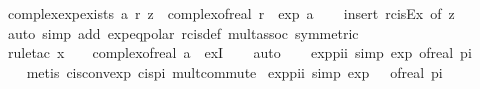 \begin{isabellebody}
\endisatagproof
{\isafoldproof}%
%
\isadelimproof
\isanewline
%
\endisadelimproof
\isanewline
{}\isamarkupfalse%
\ complex{\isacharunderscore}{\kern0pt}exp{\isacharunderscore}{\kern0pt}exists{\isacharcolon}{\kern0pt}\ {\isachardoublequoteopen}{\isasymexists}a\ r{\isachardot}{\kern0pt}\ z\ {\isacharequal}{\kern0pt}\ complex{\isacharunderscore}{\kern0pt}of{\isacharunderscore}{\kern0pt}real\ r\ {\isacharasterisk}{\kern0pt}\ exp\ a{\isachardoublequoteclose}\isanewline
%
\isadelimproof
\ \ %
\endisadelimproof
%
\isatagproof
{}\isamarkupfalse%
\ {\isacharparenleft}{\kern0pt}insert\ rcis{\isacharunderscore}{\kern0pt}Ex\ {\isacharbrackleft}{\kern0pt}of\ z{\isacharbrackright}{\kern0pt}{\isacharparenright}{\kern0pt}\isanewline
\ \ \isamarkupfalse%
\ {\isacharparenleft}{\kern0pt}auto\ simp\ add{\isacharcolon}{\kern0pt}\ exp{\isacharunderscore}{\kern0pt}eq{\isacharunderscore}{\kern0pt}polar\ rcis{\isacharunderscore}{\kern0pt}def\ mult{\isachardot}{\kern0pt}assoc\ {\isacharbrackleft}{\kern0pt}symmetric{\isacharbrackright}{\kern0pt}{\isacharparenright}{\kern0pt}\isanewline
\ \ \isamarkupfalse%
\ {\isacharparenleft}{\kern0pt}rule{\isacharunderscore}{\kern0pt}tac\ x\ {\isacharequal}{\kern0pt}\ {\isachardoublequoteopen}{\isasymi}\ {\isacharasterisk}{\kern0pt}\ complex{\isacharunderscore}{\kern0pt}of{\isacharunderscore}{\kern0pt}real\ a{\isachardoublequoteclose}\ \ exI{\isacharparenright}{\kern0pt}\isanewline
\ \ \isamarkupfalse%
\ auto\isanewline
\ \ \isamarkupfalse%
%
\endisatagproof
{\isafoldproof}%
%
\isadelimproof
\isanewline
%
\endisadelimproof
\isanewline
{}\isamarkupfalse%
\ exp{\isacharunderscore}{\kern0pt}pi{\isacharunderscore}{\kern0pt}i\ {\isacharbrackleft}{\kern0pt}simp{\isacharbrackright}{\kern0pt}{\isacharcolon}{\kern0pt}\ {\isachardoublequoteopen}exp\ {\isacharparenleft}{\kern0pt}of{\isacharunderscore}{\kern0pt}real\ pi\ {\isacharasterisk}{\kern0pt}\ {\isasymi}{\isacharparenright}{\kern0pt}\ {\isacharequal}{\kern0pt}\ {\isacharminus}{\kern0pt}{}{\isachardoublequoteclose}\isanewline
%
\isadelimproof
\ \ %
\endisadelimproof
%
\isatagproof
{}\isamarkupfalse%
\ {\isacharparenleft}{\kern0pt}metis\ cis{\isacharunderscore}{\kern0pt}conv{\isacharunderscore}{\kern0pt}exp\ cis{\isacharunderscore}{\kern0pt}pi\ mult{\isachardot}{\kern0pt}commute{\isacharparenright}{\kern0pt}%
\endisatagproof
{\isafoldproof}%
%
\isadelimproof
\isanewline
%
\endisadelimproof
\isanewline
{}\isamarkupfalse%
\ exp{\isacharunderscore}{\kern0pt}pi{\isacharunderscore}{\kern0pt}i{\isacharprime}{\kern0pt}\ {\isacharbrackleft}{\kern0pt}simp{\isacharbrackright}{\kern0pt}{\isacharcolon}{\kern0pt}\ {\isachardoublequoteopen}exp\ {\isacharparenleft}{\kern0pt}{\isasymi}\ {\isacharasterisk}{\kern0pt}\ of{\isacharunderscore}{\kern0pt}real\ pi{\isacharparenright}{\kern0pt}\ {\isacharequal}{\kern0pt}\ {\isacharminus}{\kern0pt}{}{\isachardoublequoteclose}\isanewline

\end{isabellebody}
